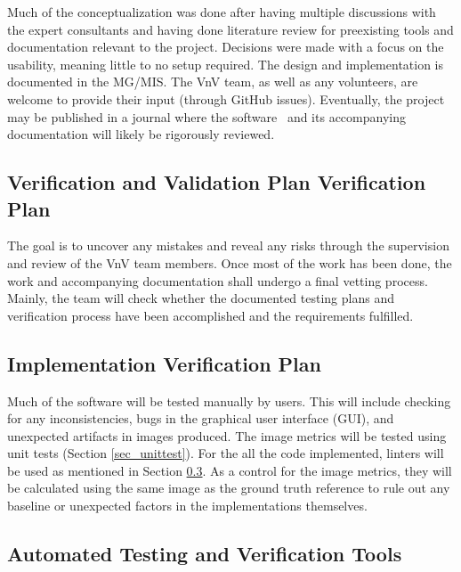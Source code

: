 \documentclass[12pt, titlepage]{article}
\begin{document}
Much of the conceptualization was done after having multiple discussions with the expert 
consultants and having done literature review for preexisting tools and documentation 
relevant to the project. Decisions were made with a focus on the usability, meaning little to 
no setup required. The design and implementation is documented in the 
MG\citep{MG}/MIS\citep{MIS}.
The VnV team, as well as any volunteers, are welcome to provide
their input (through GitHub issues). Eventually, the project may be published in a journal
where the software \progname~and its accompanying documentation will 
likely be rigorously reviewed.



\subsection{Verification and Validation Plan Verification Plan}

The goal is to uncover any mistakes and reveal any risks through the supervision and 
review of the VnV team members. Once most of the work has been done, the work and
accompanying documentation shall undergo a final vetting process. Mainly, the team
will check whether the documented testing plans and verification process have been 
accomplished and the requirements fulfilled.


\subsection{Implementation Verification Plan}  \label{sec_impl_vplan}

Much of the software will be tested manually by users. This will include checking for
any inconsistencies, bugs in the graphical user interface (GUI), and unexpected
artifacts in images produced.
The image metrics will be tested using unit tests (Section \ref{sec_unittest}). For the
all the code implemented, linters will be used as mentioned in Section \ref{sec_autotest_tools}.
As a control for the image metrics, they will be calculated using the same image as the ground truth 
reference to rule out any baseline or unexpected factors in the implementations themselves.


\subsection{Automated Testing and Verification Tools} \label{sec_autotest_tools}
\end{document}
